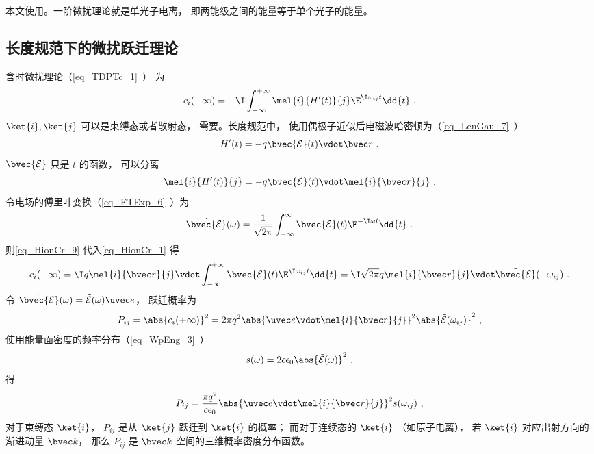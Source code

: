 

本文使用。一阶微扰理论就是单光子电离， 即两能级之间的能量等于单个光子的能量。

\subsection{长度规范下的微扰跃迁理论}
含时微扰理论（\autoref{eq_TDPTc_1}~） 为
\begin{equation}\label{eq_HionCr_1}
c_i(+\infty) = -\I \int_{-\infty}^{+\infty} \mel{i}{H'(t)}{j} \E^{\I\omega_{ij} t} \dd{t}~.
\end{equation}
$\ket{i},\ket{j}$ 可以是束缚态或者散射态， 需要。长度规范中， 使用偶极子近似后电磁波哈密顿为（\autoref{eq_LenGau_7}~）
\begin{equation}
H'(t) = -q\bvec {\mathcal E}(t) \vdot \bvec r~.
\end{equation}
$\bvec {\mathcal E}$ 只是 $t$ 的函数， 可以分离
\begin{equation}\label{eq_HionCr_9}
\mel{i}{H'(t)}{j} = -q\bvec {\mathcal E}(t) \vdot \mel{i}{\bvec r}{j}~,
\end{equation}
令电场的傅里叶变换（\autoref{eq_FTExp_6}~）为
\begin{equation}
\tilde {\bvec {\mathcal E}}(\omega) = \frac{1}{\sqrt{2\pi}} \int_{-\infty}^{\infty} \bvec {\mathcal E}(t) \E^{-\I\omega t} \dd{t}~.
\end{equation}
则\autoref{eq_HionCr_9} 代入\autoref{eq_HionCr_1} 得
\begin{equation}\label{eq_HionCr_7}
c_i(+\infty) = \I q \mel{i}{\bvec r}{j} \vdot \int_{-\infty}^{+\infty} \bvec {\mathcal E}(t) \E^{\I\omega_{ij} t} \dd{t} = \I \sqrt{2\pi} q \mel{i}{\bvec r}{j} \vdot \tilde {\bvec {\mathcal E}}(-\omega_{ij})~.
\end{equation}
令 $\tilde {\bvec {\mathcal E}}(\omega) = \tilde {{\mathcal E}}(\omega)\uvec e$， 跃迁概率为
\begin{equation}\label{eq_HionCr_2}
P_{ij} = \abs{c_i(+\infty)}^2 = 2\pi q^2 \abs{\uvec e \vdot \mel{i}{\bvec r}{j}}^2 \abs{\tilde {{\mathcal E}}(\omega_{ij})}^2~,
\end{equation}
使用能量面密度的频率分布（\autoref{eq_WpEng_3}~）
\begin{equation}\label{eq_HionCr_8}
s(\omega) = 2c\epsilon_0 \abs{\tilde {{\mathcal E}}(\omega)}^2~,
\end{equation}
得
\begin{equation}\label{eq_HionCr_6}
P_{ij} = \frac{\pi q^2}{c\epsilon_0} \abs{\uvec e \vdot\mel{i}{\bvec r}{j}}^2 s(\omega_{ij})~,
\end{equation}
对于束缚态 $\ket{i}$， $P_{ij}$ 是从 $\ket{j}$ 跃迁到 $\ket{i}$ 的概率； 而对于连续态的 $\ket{i}$ （如原子电离）， 若 $\ket{i}$ 对应出射方向的渐进动量 $\bvec k$， 那么 $P_{ij}$ 是 $\bvec k$ 空间的三维概率密度分布函数。

